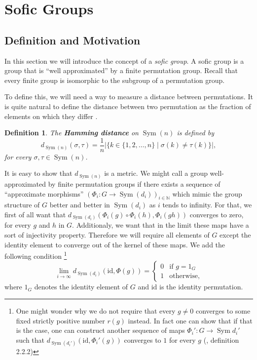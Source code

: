 \documentclass[titlepage, a4paper]{article}
\newcommand{\N}{\mathbb{N}}
\newcommand{\card}[1]{\left| #1 \right|}
\newcommand{\id}{\mathrm{id}}
\DeclareMathOperator{\sym}{Sym}
\newtheorem{definition}[theorem]{Definition}
\theoremstyle{remark}
\begin{document}
\section{Sofic Groups}\label{sec:sofic_group}

\subsection{Definition and Motivation}

In this section we will introduce the concept of a \emph{sofic group}. A sofic group is a group that is ``well approximated'' by a finite permutation group. Recall that every finite group is isomorphic to the subgroup of a permutation group.

To define this, we will need a way to measure a distance between permutations. It is quite natural to define the distance between two permutation as the fraction of elements on which they differ \cite[subsection 2.1]{capraro_lupini_2015}.

\begin{definition}
    The \textbf{Hamming distance} on $\sym(n)$ is defined by
    \[
        d_{\sym(n)}(\sigma, \tau) = \frac 1 n \card{\{k \in \{1, 2, \dots,n\} \mid \sigma(k) \neq \tau(k)\}}, 
    \]
    for every $\sigma, \tau \in \sym(n)$.
\end{definition}

It is easy to show that $d_{\sym(n)}$ is a metric.
We might call a group well-approximated by finite permutation groups if there exists a sequence of ``approximate morphisms''
$(\Phi_i: G \to \sym(d_i))_{i \in \N}$ which mimic the group structure of $G$ better and better in $\sym(d_i)$ as $i$ tends to infinity. %
For that, we first of all want that $d_{\sym(d_i)}(\Phi_i(g) \circ \Phi_i(h), \Phi_i(gh))$ converges to zero, for every $g$ and $h$ in $G$. Additionaly, we want that in the limit these maps have a sort of injectivity property. Therefore we will require all elements of $G$ except the identity element to converge out of the kernel of these maps. We add the following condition \footnote{One might wonder why we do not require that every $g \neq 0$ converges to some fixed strictly positive number $r(g)$ instead. In fact one can show that if that is the case, one can construct another sequence of maps $\Phi_i' : G \to \sym{d_i'}$ such that $d_{\sym(d_i')}(\id, \Phi_i'(g))$ converges to $1$ for every $g$ (\cite{capraro_lupini_2015}, definition 2.2.2) }
\[
\lim_{i \to \infty} d_{\sym(d_i)}(\id,\Phi(g)) = \begin{cases}  0 & \text{if } g = 1_G \\
                                        1 & \text{otherwise,}
                                        \end{cases}
\]
where $1_G$ denotes the identity element of $G$ and $\id$ is the identity permutation.
\\
\end{document}
